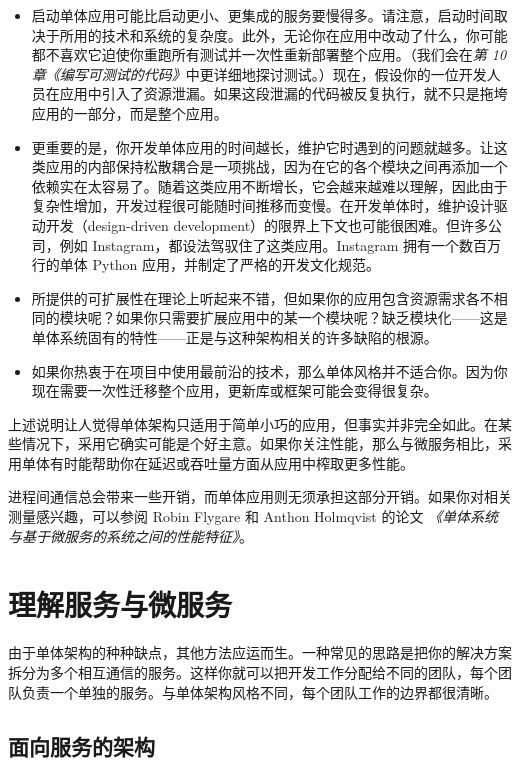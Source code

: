 \begin{itemize}
\label{idx:092}
\item 启动单体应用可能比启动更小、更集成的服务要慢得多。请注意，启动时间取决于所用的技术和系统的复杂度。此外，无论你在应用中改动了什么，你可能都不喜欢它迫使你重跑所有测试并一次性重新部署整个应用。（我们会在\emph{第 10 章}\emph{《编写可测试的代码》}中更详细地探讨测试。）现在，假设你的一位开发人员在应用中引入了资源泄漏。如果这段泄漏的代码被反复执行，就不只是拖垮应用的一部分，而是整个应用。
\label{idx:093}
\item 更重要的是，你开发单体应用的时间越长，维护它时遇到的问题就越多。让这类应用的内部保持松散耦合是一项挑战，因为在它的各个模块之间再添加一个依赖实在太容易了。随着这类应用不断增长，它会越来越难以理解，因此由于复杂性增加，开发过程很可能随时间推移而变慢。在开发单体时，维护设计驱动开发（design-driven development）的限界上下文也可能很困难。但许多公司，例如 Instagram，都设法驾驭住了这类应用。Instagram 拥有一个数百万行的单体 Python 应用，并制定了严格的开发文化规范。
\item 所提供的可扩展性在理论上听起来不错，但如果你的应用包含资源需求各不相同的模块呢？如果你只需要扩展应用中的某一个模块呢？缺乏模块化——这是单体系统固有的特性——正是与这种架构相关的许多缺陷的根源。
\item 如果你热衷于在项目中使用最前沿的技术，那么单体风格并不适合你。因为你现在需要一次性迁移整个应用，更新库或框架可能会变得很复杂。
\end{itemize}

上述说明让人觉得单体架构只适用于简单小巧的应用，但事实并非完全如此。在某些情况下，采用它确实可能是个好主意。如果你关注性能，那么与微服务相比，采用单体有时能帮助你在延迟或吞吐量方面从应用中榨取更多性能。

进程间通信总会带来一些开销，而单体应用则无须承担这部分开销。如果你对相关测量感兴趣，可以参阅 Robin Flygare 和 Anthon Holmqvist 的论文 \emph{《单体系统与基于微服务的系统之间的性能特征》}。

\section{理解服务与微服务}

由于单体架构的种种缺点，其他方法应运而生。一种常见的思路是把你的解决方案拆分为多个相互通信的服务。这样你就可以把开发工作分配给不同的团队，每个团队负责一个单独的服务。与单体架构风格不同，每个团队工作的边界都很清晰。

\subsection{面向服务的架构}

